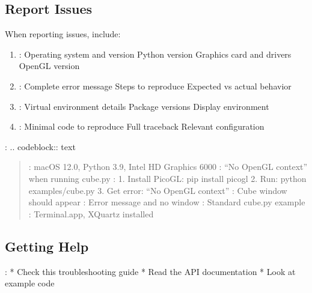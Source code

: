 \documentclass[a4paper,10pt,english,openany,oneside]{sphinxmanual}
\begin{document}
\subsection{Report Issues}
\label{\detokenize{troubleshooting:report-issues}}
\sphinxAtStartPar
When reporting issues, include:
\begin{enumerate}
%
\item {} 
\sphinxAtStartPar
{}:
\sphinxhyphen{} Operating system and version
\sphinxhyphen{} Python version
\sphinxhyphen{} Graphics card and drivers
\sphinxhyphen{} OpenGL version

\item {} 
\sphinxAtStartPar
{}:
\sphinxhyphen{} Complete error message
\sphinxhyphen{} Steps to reproduce
\sphinxhyphen{} Expected vs actual behavior

\item {} 
\sphinxAtStartPar
{}:
\sphinxhyphen{} Virtual environment details
\sphinxhyphen{} Package versions
\sphinxhyphen{} Display environment

\item {} 
\sphinxAtStartPar
{}:
\sphinxhyphen{} Minimal code to reproduce
\sphinxhyphen{} Full traceback
\sphinxhyphen{} Relevant configuration

\end{enumerate}

\sphinxAtStartPar
{}:
.. code\sphinxhyphen{}block:: text
\begin{quote}

\sphinxAtStartPar
{}: macOS 12.0, Python 3.9, Intel HD Graphics 6000
: “No OpenGL context” when running cube.py
:
1. Install PicoGL: pip install picogl
2. Run: python examples/cube.py
3. Get error: “No OpenGL context”
: Cube window should appear
: Error message and no window
: Standard cube.py example
: Terminal.app, XQuartz installed
\end{quote}


\subsection{Getting Help}
\label{\detokenize{troubleshooting:getting-help}}
\sphinxAtStartPar
{}:
* Check this troubleshooting guide
* Read the API documentation
* Look at example code
\end{document}
